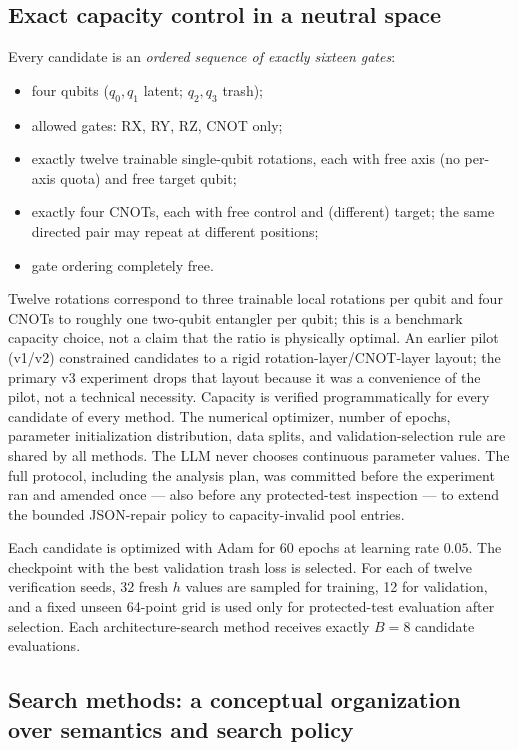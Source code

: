 \documentclass[11pt]{article}
\begin{document}
\subsection{Exact capacity control in a neutral space}

Every candidate is an \emph{ordered sequence of exactly sixteen gates}:
\begin{itemize}[nosep]
\item four qubits ($q_0,q_1$ latent; $q_2,q_3$ trash);
\item allowed gates: RX, RY, RZ, CNOT only;
\item exactly twelve trainable single-qubit rotations, each with free axis (no per-axis quota) and free target qubit;
\item exactly four CNOTs, each with free control and (different) target; the same directed pair may repeat at different positions;
\item gate ordering completely free.
\end{itemize}

Twelve rotations correspond to three trainable local rotations per qubit and four CNOTs to roughly one two-qubit entangler per qubit; this is a benchmark capacity choice, not a claim that the ratio is physically optimal.
An earlier pilot (v1/v2) constrained candidates to a rigid rotation-layer/CNOT-layer layout; the primary v3 experiment drops that layout because it was a convenience of the pilot, not a technical necessity.
Capacity is verified programmatically for every candidate of every method.
The numerical optimizer, number of epochs, parameter initialization distribution, data splits, and validation-selection rule are shared by all methods.
The LLM never chooses continuous parameter values.
The full protocol, including the analysis plan, was committed before the experiment ran and amended once --- also before any protected-test inspection --- to extend the bounded JSON-repair policy to capacity-invalid pool entries.

Each candidate is optimized with Adam for 60 epochs at learning rate $0.05$.
The checkpoint with the best validation trash loss is selected.
For each of twelve verification seeds, 32 fresh $h$ values are sampled for training, 12 for validation, and a fixed unseen 64-point grid is used only for protected-test evaluation after selection.
Each architecture-search method receives exactly $B=8$ candidate evaluations.

\subsection{Search methods: a conceptual organization over semantics and search policy}
\end{document}
